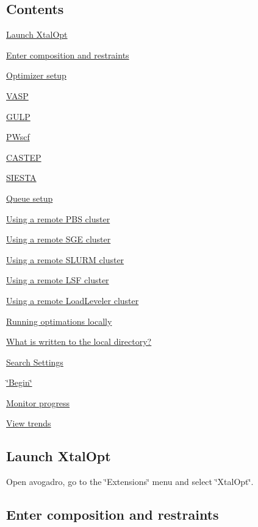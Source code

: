 \hypertarget{optschemes_Contents}{}\subsection{Contents}\label{optschemes_Contents}

\begin{DoxyItemize}
\item \hyperlink{tut-xo_launch}{Launch Xtal\+Opt}
\item \hyperlink{tut-xo_init}{Enter composition and restraints}
\item \hyperlink{tut-xo_opt}{Optimizer setup}
\begin{DoxyItemize}
\item \hyperlink{tut-xo_vasp-opt}{V\+A\+S\+P}
\item \hyperlink{tut-xo_gulp-opt}{G\+U\+L\+P}
\item \hyperlink{tut-xo_pwscf-opt}{P\+Wscf}
\item \hyperlink{tut-xo_castep-opt}{C\+A\+S\+T\+E\+P}
\item \hyperlink{tut-xo_siesta-opt}{S\+I\+E\+S\+T\+A}
\end{DoxyItemize}
\item \hyperlink{tut-xo_qisetup}{Queue setup}
\begin{DoxyItemize}
\item \hyperlink{tut-xo_remotepbs}{Using a remote P\+B\+S cluster}
\item \hyperlink{tut-xo_remotesge}{Using a remote S\+G\+E cluster}
\item \hyperlink{tut-xo_remoteslurm}{Using a remote S\+L\+U\+R\+M cluster}
\item \hyperlink{tut-xo_remotelsf}{Using a remote L\+S\+F cluster}
\item \hyperlink{tut-xo_remotell}{Using a remote Load\+Leveler cluster}
\item \hyperlink{tut-xo_localqi}{Running optimations locally}
\end{DoxyItemize}
\item \hyperlink{tut-xo_files}{What is written to the local directory?}
\item \hyperlink{tut-xo_search-set}{Search Settings}
\item \hyperlink{tut-xo_begin}{\char`\"{}\+Begin\char`\"{}}
\item \hyperlink{tut-xo_prog-mon}{Monitor progress}
\begin{DoxyItemize}
\item \hyperlink{tut-xo_trends}{View trends}
\end{DoxyItemize}
\end{DoxyItemize}\hypertarget{tut-xo_launch}{}\subsection{Launch Xtal\+Opt}\label{tut-xo_launch}
Open avogadro, go to the \char`\"{}\+Extensions\char`\"{} menu and select \char`\"{}\+Xtal\+Opt\char`\"{}.\hypertarget{tut-xo_init}{}\subsection{Enter composition and restraints}\label{tut-xo_init}
 
